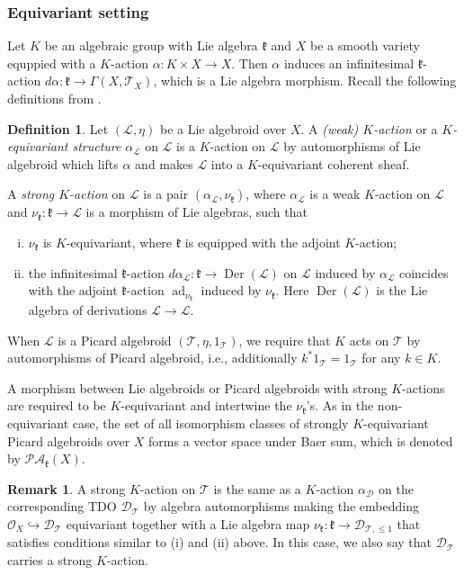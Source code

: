 \documentclass[12pt]{amsart}
\newcommand{\kf}{\mathfrak{k}}
\newcommand{\T}{\mathcal{T}}
\newcommand{\TT}{\mathscr{T}}
\newcommand{\LL}{\mathcal{L}}
\newcommand{\pic}{\mathscr{PA}}
\newcommand{\der}{{\operatorname{Der}}}
\theoremstyle{definition}
\newtheorem{defi}[Thm]{Definition}
\newtheorem{Rem}[Thm]{Remark}
\numberwithin{equation}{section}
\begin{document}
\subsubsection{Equivariant setting}
Let $K$ be an algebraic group with Lie algebra $\kf$ and $X$ be a smooth variety equppied with a $K$-action $\alpha: K \times X \to X$. Then $\alpha$ induces an infinitesimal $\kf$-action $d \alpha: \kf \to \Gamma(X, \T_X)$, which is a Lie algebra morphism. Recall the following definitions from \cite[Section 1.8]{BB}.

\begin{defi}\label{defn:pic_action}
	Let $(\LL, \eta)$ be a Lie algebroid over $X$. A {\it (weak) $K$-action} or a {\it $K$-equivariant structure} $\alpha_\LL$ on $\LL$ is a $K$-action on $\LL$ by automorphisms of Lie algebroid which lifts $\alpha$ and makes $\LL$ into a $K$-equivariant coherent sheaf.
	
	A {\it strong $K$-action} on $\LL$ is a pair $(\alpha_\LL, \nu_\kf)$, where $\alpha_\LL$ is a weak $K$-action on $\LL$ and $\nu_\kf: \kf \to \LL$ is a morphism of Lie algebras, such that
	\begin{enumerate}[(i)]
		\item
		$\nu_\kf$ is $K$-equivariant, where $\kf$ is equipped with the adjoint $K$-action;
		\item
		the infinitesimal $\kf$-action $d\alpha_\LL: \kf \to \der(\LL)$ on $\LL$ induced by $\alpha_\LL$ coincides with the adjoint $\kf$-action $\operatorname{ad}_{\nu_\kf}$ induced by $\nu_\kf$. Here
		$\der(\LL)$ is the Lie algebra of derivations $\LL\rightarrow \LL$.
	\end{enumerate}
	
	When $\LL$ is a Picard algebroid $(\TT, \eta, 1_\TT)$, we require that $K$ acts on $\TT$ by automorphisms of Picard algebroid, i.e., additionally $k^* 1_\TT = 1_\TT$ for any $k \in K$.
	
	A morphism between Lie algebroids or Picard algebroids with strong $K$-actions are required to be $K$-equivariant and intertwine the $\nu_\kf$'s. As in the non-equivariant case, the set of all isomorphism classes of strongly $K$-equivariant Picard algebroids over $X$ forms a vector space under Baer sum, which is denoted by $\pic_\kf(X)$.
\end{defi}

\begin{Rem}\label{rem:strong_diff}
	A strong $K$-action on $\TT$ is the same as a $K$-action $\alpha_{\mathscr{D}}$ on the corresponding TDO $\mathscr{D}_\TT$ by algebra automorphisms making the embedding $\mathcal{O}_X\hookrightarrow \mathscr{D}_\TT$ equivariant together with a Lie algebra map $\nu_\kf: \kf \to \mathscr{D}_{\TT, \leqslant 1}$ that satisfies conditions similar to (i) and (ii) above. In this case, we also say that $\mathscr{D}_\TT$ carries a strong $K$-action.
\end{Rem}
\end{document}
